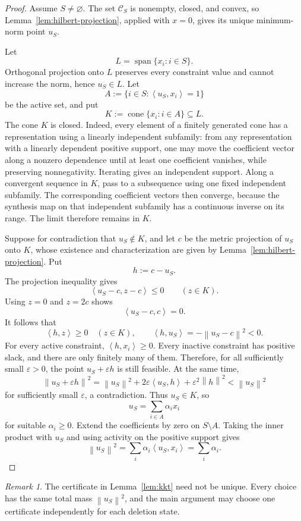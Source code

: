 \documentclass[11pt]{article}
\theoremstyle{definition}
\theoremstyle{remark}
\newtheorem{remark}[theorem]{Remark}
\newcommand{\ip}[2]{\left\langle #1,#2\right\rangle}
\newcommand{\norm}[1]{\left\lVert #1\right\rVert}
\begin{document}
\begin{proof}
Assume \(S\ne\varnothing\). The set \(\mathcal C_S\) is nonempty, closed,
and convex, so Lemma~\ref{lem:hilbert-projection}, applied with \(x=0\),
gives its unique minimum-norm point \(u_S\).

Let
\[
 L=\operatorname{span}\{x_i:i\in S\}.
\]
Orthogonal projection onto \(L\) preserves every constraint value and cannot
increase the norm, hence \(u_S\in L\). Let
\[
 A:=\{i\in S:\ip{u_S}{x_i}=1\}
\]
be the active set, and put
\[
 K:=\operatorname{cone}\{x_i:i\in A\}\subseteq L.
\]
The cone \(K\) is closed. Indeed, every element of a finitely generated cone
has a representation using a linearly independent subfamily: from any
representation with a linearly dependent positive support, one may move the
coefficient vector along a nonzero dependence until at least one coefficient
vanishes, while preserving nonnegativity. Iterating gives an independent
support. Along a convergent sequence in \(K\), pass to a subsequence using
one fixed independent subfamily. The corresponding coefficient vectors then
converge, because the synthesis map on that independent subfamily has a
continuous inverse on its range. The limit therefore remains in \(K\).

Suppose for contradiction that \(u_S\notin K\), and let \(c\) be the metric
projection of \(u_S\) onto \(K\), whose existence and characterization are
given by Lemma~\ref{lem:hilbert-projection}. Put
\[
 h:=c-u_S.
\]
The projection inequality gives
\[
 \ip{u_S-c}{z-c}\le0\qquad(z\in K).
\]
Using \(z=0\) and \(z=2c\) shows
\[
 \ip{u_S-c}{c}=0.
\]
It follows that
\[
 \ip{h}{z}\ge0\quad(z\in K),
 \qquad
 \ip{h}{u_S}=-\norm{u_S-c}^2<0.
\]
For every active constraint, \(\ip{h}{x_i}\ge0\). Every inactive constraint
has positive slack, and there are only finitely many of them. Therefore, for
all sufficiently small \(\varepsilon>0\), the point
\(u_S+\varepsilon h\) is still feasible. At the same time,
\[
 \norm{u_S+\varepsilon h}^2
 =
 \norm{u_S}^2
 +2\varepsilon\ip{u_S}{h}
 +\varepsilon^2\norm h^2
 <
 \norm{u_S}^2
\]
for sufficiently small \(\varepsilon\), a contradiction. Thus \(u_S\in K\),
so
\[
 u_S=\sum_{i\in A}\alpha_i x_i
\]
for suitable \(\alpha_i\ge0\). Extend the coefficients by zero on
\(S\setminus A\). Taking the inner product with \(u_S\) and using activity
on the positive support gives
\[
 \norm{u_S}^2
 =
 \sum_i\alpha_i\ip{u_S}{x_i}
 =
 \sum_i\alpha_i.
\]
\end{proof}

\begin{remark}
The certificate in Lemma~\ref{lem:kkt} need not be unique. Every choice has
the same total mass \(\norm{u_S}^2\), and the main argument may choose one
certificate independently for each deletion state.
\end{remark}
\end{document}
